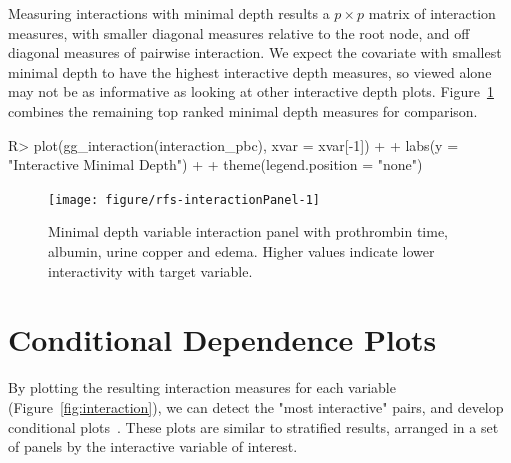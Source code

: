 \documentclass[nojss]{jss}\usepackage[]{graphicx}\usepackage[]{color}
\begin{document}
Measuring interactions with minimal depth results a $p \times p$ matrix of interaction measures, with smaller diagonal measures relative to the root node, and off diagonal measures of pairwise interaction. We expect the covariate with smallest minimal depth to have the highest interactive depth measures, so viewed alone may not be as informative as looking at other interactive depth plots. Figure~\ref{fig:interactionPanel} combines the remaining top ranked minimal depth measures for comparison.
\begin{Schunk}
\begin{Sinput}
R> plot(gg_interaction(interaction_pbc), xvar = xvar[-1]) + 
+   labs(y = "Interactive Minimal Depth") + 
+   theme(legend.position = "none")
\end{Sinput}
\begin{figure}[!htpb]

{\centering \texttt{[image: figure/rfs-interactionPanel-1]} 

}

\caption[Minimal depth variable interaction panel with prothrombin time, albumin, urine copper and edema]{Minimal depth variable interaction panel with prothrombin time, albumin, urine copper and edema. Higher values indicate lower interactivity with target variable.\label{fig:interactionPanel}}
\end{figure}
\end{Schunk}

\section{Conditional Dependence Plots}\label{S:coplots}

By plotting the resulting interaction measures for each variable (Figure~\ref{fig:interaction}), we can detect the "most interactive" pairs, and develop conditional plots~\cite{chambers:1992, cleveland:1993}. These plots are similar to stratified results, arranged in a set of panels by the interactive variable of interest. 
\end{document}
